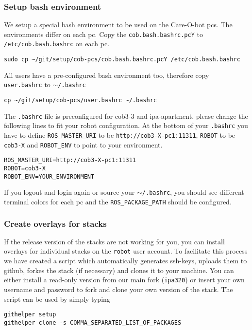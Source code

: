 \subsubsection{Setup bash environment}
We setup a special bash environment to be used on the Care-O-bot pcs. The environments differ on each pc. Copy the \texttt{cob.bash.bashrc.pcY} to \texttt{/etc/cob.bash.bashrc} on each pc.

\begin{lstlisting}
sudo cp ~/git/setup/cob-pcs/cob.bash.bashrc.pcY /etc/cob.bash.bashrc
\end{lstlisting}

All users have a pre-configured bash environment too, therefore copy \texttt{user.bashrc} to \texttt{$\sim$/.bashrc}
\begin{lstlisting}
cp ~/git/setup/cob-pcs/user.bashrc ~/.bashrc
\end{lstlisting}
The \texttt{.bashrc} file is preconfigured for cob3-3 and ipa-apartment, please change the following lines to fit your robot configuration. At the bottom of your \texttt{.bashrc} you have to define \texttt{ROS\_MASTER\_URI} to be \texttt{http://cob3-X-pc1:11311}, \texttt{ROBOT} to be \texttt{cob3-X} and \texttt{ROBOT\_ENV} to point to your environment.
\begin{lstlisting}
ROS_MASTER_URI=http://cob3-X-pc1:11311
ROBOT=cob3-X
ROBOT_ENV=YOUR_ENVIRONMENT
\end{lstlisting}

If you logout and login again or source your \texttt{$\sim$/.bashrc}, you should see different terminal colors for each pc and the \texttt{ROS\_PACKAGE\_PATH} should be configured. 

\subsubsection{Create overlays for stacks}
If the release version of the stacks are not working for you, you can install overlays for individual stacks on the \texttt{robot} user account. To facilitate this process we have created a script which automatically generates ssh-keys, uploads them to github, forkes the stack (if necessary) and clones it to your machine. You can either install a read-only version from our main fork (\texttt{ipa320}) or insert your own username and password to fork and clone your own version of the stack. The script can be used by simply typing
\begin{lstlisting}
githelper setup
githelper clone -s COMMA_SEPARATED_LIST_OF_PACKAGES
\end{lstlisting}

